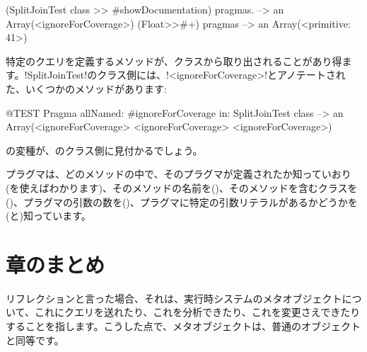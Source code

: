 \documentclass[a4paper,10pt,twoside]{book}
\begin{document}
\begin{code}{}
(SplitJoinTest class >> #showDocumentation) pragmas.
  --> an Array(<ignoreForCoverage>)
(Float>>#+) pragmas --> an Array(<primitive: 41>)
\end{code}

特定のクエリを定義するメソッドが、クラスから取り出されることがあり得ます。\ct!SplitJoinTest!のクラス側には、\ct!<ignoreForCoverage>!とアノテートされた、いくつかのメソッドがあります:

\begin{code}{@TEST}
Pragma allNamed: #ignoreForCoverage in: SplitJoinTest class  --> an Array(<ignoreForCoverage> <ignoreForCoverage> <ignoreForCoverage>)
\end{code}

の変種が、のクラス側に見付かるでしょう。

プラグマは、どのメソッドの中で、そのプラグマが定義されたか知っていおり(を使えばわかります)、そのメソッドの名前を()、そのメソッドを含むクラスを()、プラグマの引数の数を()、プラグマに特定の引数リテラルがあるかどうかを(と)知っています。 


\section{章のまとめ}

リフレクションと言った場合、それは、実行時システムのメタオブジェクトについて、これにクエリを送れたり、これを分析できたり、これを変更さえできたりすることを指します。こうした点で、メタオブジェクトは、普通のオブジェクトと同等です。
\end{document}
